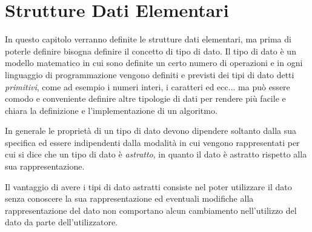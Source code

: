 \chapter{Strutture Dati Elementari}
In questo capitolo verranno definite le strutture dati elementari, ma prima di poterle
definire bisogna definire il concetto di tipo di dato.\newline
Il tipo di dato è un modello matematico in cui sono definite un certo numero di operazioni
e in ogni linguaggio di programmazione vengono definiti e previsti dei tipi di dato detti
\emph{primitivi}, come ad esempio i numeri interi, i caratteri ed ecc... ma può
essere comodo e conveniente definire altre tipologie di dati per rendere più facile e chiara
la definizione e l'implementazione di un algoritmo.

In generale le proprietà di un tipo di dato devono dipendere soltanto dalla sua specifica
ed essere indipendenti dalla modalità in cui vengono rappresentati per cui si dice
che un tipo di dato è \emph{astratto}, in quanto il dato è astratto rispetto alla sua rappresentazione.

Il vantaggio di avere i tipi di dato astratti consiste nel poter utilizzare il dato
senza conoscere la sua rappresentazione ed eventuali modifiche alla rappresentazione del dato
non comportano alcun cambiamento nell'utilizzo del dato da parte dell'utilizzatore.




